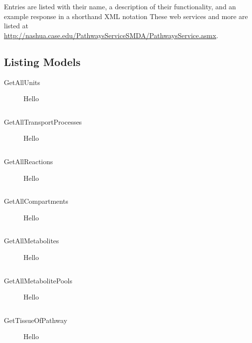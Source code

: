 Entries are listed with their name, a description of their functionality, and
an example response in a shorthand XML notation These web services and more
are listed at \\
\href{http://nashua.case.edu/PathwaysServiceSMDA/PathwaysService.asmx}{http://nashua.case.edu/PathwaysServiceSMDA/PathwaysService.asmx}.

\subsection{Listing Models}
\begin{description}

    \item[GetAllUnits] Hello

    \begin{lstlisting}
    \end{lstlisting}

    \item[GetAllTransportProcesses] Hello

    \begin{lstlisting}
    \end{lstlisting}

    \item[GetAllReactions] Hello

    \begin{lstlisting}
    \end{lstlisting}

    \item[GetAllCompartments] Hello

    \begin{lstlisting}
    \end{lstlisting}

    \item[GetAllMetabolites] Hello

    \begin{lstlisting}
    \end{lstlisting}

    \item[GetAllMetabolitePools] Hello

    \begin{lstlisting}
    \end{lstlisting}

    \item[GetTissueOfPathway] Hello

    \begin{lstlisting}
    \end{lstlisting}


\end{description}
